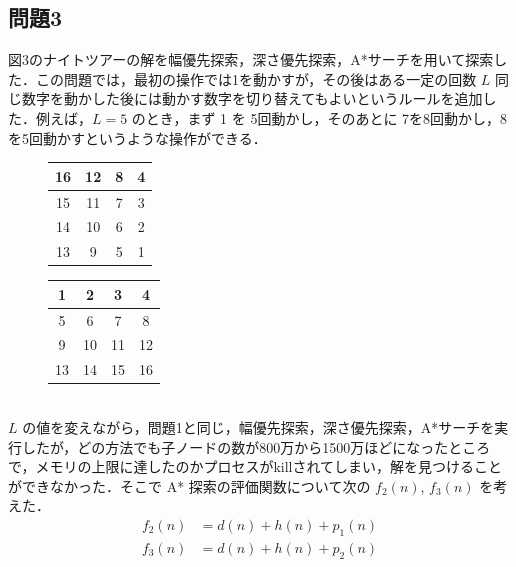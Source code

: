 \documentclass[a4paper, twocolumn]{ltjsarticle}
\begin{document}
\subsection*{問題3}
図3のナイトツアーの解を幅優先探索，深さ優先探索，A*サーチを用いて探索した．この問題では，最初の操作では1を動かすが，その後はある一定の回数 $L$ 同じ数字を動かした後には動かす数字を切り替えてもよいというルールを追加した．例えば，$L = 5$ のとき，まず 1 を 5回動かし，そのあとに 7を8回動かし，8を5回動かすというような操作ができる．
\begin{figure}[h]
    \centering
    \begin{minipage}{0.45\linewidth}
        \centering
        \begin{tabular}{|@{\hskip 3.5pt}c@{\hskip 3.5pt}|@{\hskip 3.5pt}c@{\hskip 3.5pt}|@{\hskip 5pt}c@{\hskip 5pt}|@{\hskip 5pt}c@{\hskip 5pt}|}
            \hline
            16 & 12 & 8 & 4\\ \hline
            15 & 11 & 7 & 3\\ \hline
            14 & 10 & 6 & 2\\ \hline
            13 & 9 & 5 & 1\\ \hline
        \end{tabular}
    \end{minipage}
    \hfill
    \begin{minipage}{0.45\linewidth}
        \centering
        \begin{tabular}{|@{\hskip 3.5pt}c@{\hskip 3.5pt}|@{\hskip 3.5pt}c@{\hskip 3.5pt}|@{\hskip 3.5pt}c@{\hskip 3.5pt}|@{\hskip 3.5pt}c@{\hskip 3.5pt}|}
            \hline
            1 & 2 & 3 & 4\\ \hline
            5 & 6 & 7 & 8\\ \hline
            9 & 10 & 11 & 12\\ \hline
            13 & 14 & 15 & 16\\ \hline
        \end{tabular}
    \end{minipage}
    \caption{}
\end{figure}
\\\quad $L$ の値を変えながら，問題1と同じ，幅優先探索，深さ優先探索，A*サーチを実行したが，どの方法でも子ノードの数が800万から1500万ほどになったところで，メモリの上限に達したのかプロセスがkillされてしまい，解を見つけることができなかった．そこで A* 探索の評価関数について次の $f_2(n)$, $f_3(n)$ を考えた．
\begin{align}
    f_2(n) &= d(n) + h(n) + p_1(n)\\
    f_3(n) &= d(n) + h(n) + p_2(n)
\end{align}
\end{document}
